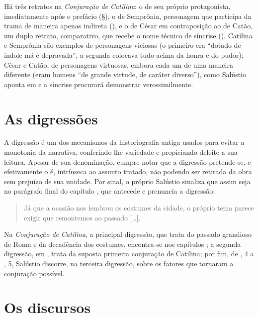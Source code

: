 Há três retratos na \emph{Conjuração de Catilina}: o de seu próprio
protagonista, imediatamente após o prefácio (§), o de Semprônia, personagem
que participa da trama de maneira apenas indireta (), e o de César em
contraposição ao de Catão, um duplo retrato, comparativo, que recebe o nome
técnico de síncrise (). Catilina e Semprônia são exemplos de personagens
viciosas (o primeiro era “dotado de índole má e depravada”, a segunda colocava
tudo acima da honra e do pudor); César e Catão, de personagens virtuosas,
embora cada um de uma maneira diferente (eram homens “de grande virtude, de
caráter diverso”), como Salústio aponta em  e a síncrise procurará
demonstrar verossimilmente.

\section{As digressões}

A digressão é um dos mecanismos da historiografia antiga usados para evitar a
monotonia da narrativa, conferindo-lhe variedade e propiciando deleite a sua
leitura. Apesar de sua denominação, cumpre notar que a digressão pretende-se, e
efetivamente o é, intrínseca ao assunto tratado, não podendo ser retirada da
obra sem prejuízo de sua unidade. Por sinal, o próprio Salústio sinaliza que
assim seja no parágrafo final do capítulo , que antecede e prenuncia a
digressão: \begin {quote} Já que a ocasião nos lembrou os costumes da cidade, o
próprio tema parece exigir que remontemos ao passado [\ldots{}].  \end{quote} Na
\emph{Conjuração de Catilina}, a principal digressão, que trata do passado
grandioso de Roma e da decadência dos costumes, encontra-se nos capítulos ;
a segunda digressão, em , trata da suposta primeira conjuração de
Catilina; por fim, de , 4 a , 5, Salústio discorre, na terceira digressão,
sobre os fatores que tornaram a conjuração possível.  \section{Os discursos}
 

